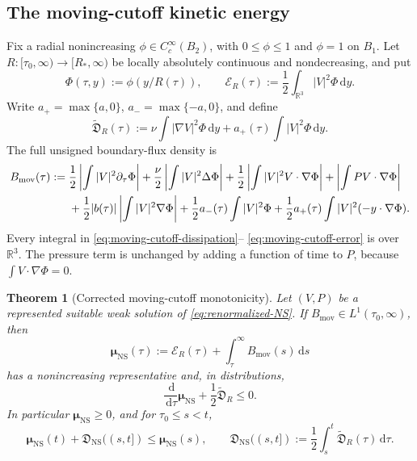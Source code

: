 \documentclass[11pt]{amsart}
\numberwithin{equation}{section}
\theoremstyle{plain}
\newtheorem{theorem}{Theorem}[section]
\theoremstyle{definition}
\theoremstyle{remark}
\newcommand{\R}{\mathbb R}
\newcommand{\dd}{\,\mathrm d}
\newcommand{\EntropyNS}{\boldsymbol\mu_{\mathrm{NS}}}
\newcommand{\ProductionNS}{\mathfrak D_{\mathrm{NS}}}
\begin{document}
\subsection{The moving-cutoff kinetic energy}

Fix a radial nonincreasing \(\phi\in C_c^\infty(B_2)\), with
\(0\le\phi\le1\) and \(\phi=1\) on \(B_1\).  Let
\(R:[\tau_0,\infty)\to[R_*,\infty)\) be locally absolutely continuous and
nondecreasing, and put
\begin{equation}\label{eq:moving-cutoff-cutoff}
 \Phi(\tau,y):=\phi(y/R(\tau)),\qquad
 \mathcal E_R(\tau):=\frac12\int_{\R^3}|V|^2\Phi\dd y.
\end{equation}
Write \(a_+=\max\{a,0\}\), \(a_-=\max\{-a,0\}\), and define
\begin{equation}\label{eq:moving-cutoff-dissipation}
 \widetilde{\mathfrak D}_R(\tau)
 :=\nu\int|\nabla V|^2\Phi\dd y
   +a_+(\tau)\int|V|^2\Phi\dd y.
\end{equation}
The full unsigned boundary-flux density is
\begin{align}
 B_{\mathrm{mov}}(\tau):={}&
 \frac12\left|\int |V|^2\partial_\tau\Phi\right|
 +\frac\nu2\left|\int |V|^2\Delta\Phi\right|
 +\frac12\left|\int |V|^2V\cdot\nabla\Phi\right|
 +\left|\int PV\cdot\nabla\Phi\right| \notag\\
 &+\frac12|b(\tau)|\left|\int |V|^2\nabla\Phi\right|
 +\frac12a_-(\tau)\int |V|^2\Phi
 +\frac12a_+(\tau)\int |V|^2(-y\cdot\nabla\Phi).
 \label{eq:moving-cutoff-error}
\end{align}
Every integral in \eqref{eq:moving-cutoff-dissipation}--
\eqref{eq:moving-cutoff-error} is over \(\R^3\).  The pressure term is
unchanged by adding a function of time to \(P\), because
\(\int V\cdot\nabla\Phi=0\).

\begin{theorem}[Corrected moving-cutoff monotonicity]
\label{thm:moving-cutoff-monotonicity}
Let \((V,P)\) be a represented suitable weak solution of
\eqref{eq:renormalized-NS}.  If \(B_{\mathrm{mov}}\in
L^1(\tau_0,\infty)\), then
\begin{equation}\label{eq:moving-cutoff-entropy-definition}
 \EntropyNS(\tau):=\mathcal E_R(\tau)
   +\int_\tau^\infty B_{\mathrm{mov}}(s)\dd s
\end{equation}
has a nonincreasing representative and, in distributions,
\begin{equation}\label{eq:moving-cutoff-entropy-production}
 \frac{\dd}{\dd\tau}\EntropyNS
 +\frac12\widetilde{\mathfrak D}_R\le0.
\end{equation}
In particular \(\EntropyNS\ge0\), and for \(\tau_0\le s<t\),
\begin{equation}\label{eq:global-entropy-error-balance}
 \EntropyNS(t)+\ProductionNS((s,t])\le\EntropyNS(s),
 \qquad
 \ProductionNS((s,t]):=\frac12\int_s^t
 \widetilde{\mathfrak D}_R(\tau)\dd\tau.
\end{equation}
\end{theorem}
\end{document}

